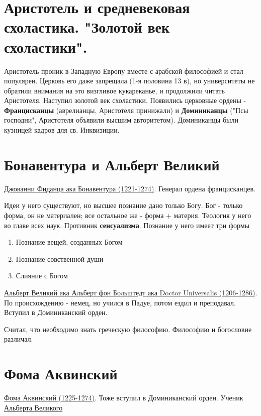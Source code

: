 \section{Аристотель и средневековая схоластика. "Золотой век схоластики".}
Аристотель проник в Западную Европу вместе с арабской философией и стал популярен. Церковь его даже запрещала (1-я половина 13 в), но университеты не обратили внимания на это визгливое кукареканье, и продолжили читать Аристотеля. Наступил золотой век схоластики. Появились церковные ордены - \textbf{Францисканцы} (аврелианцы, Аристотеля принижали) и \textbf{Доминиканцы} ("Псы господни", Аристотеля объявили высшим авторитетом). Доминиканцы были кузницей кадров для св. Инквизиции.

\section{Бонавентура и Альберт Великий}
\underline{Джованни Фиданца ака Бонавентура (1221-1274)}. Генерал ордена францисканцев. 

Идеи у него существуют, но высшее познание дано только Богу. Бог - только форма, он не материален; все остальное же - форма + материя. Теология у него во главе всех наук. Противник \textbf{сенсуализма}. Познание у него имеет три формы
\begin{enumerate}
\item Познание вещей, созданных Богом
\item Познание совственной души
\item Слияние с Богом
\end{enumerate}


\underline{Альберт Великий  ака Альберт фон Больштедт ака Doctor Universalis (1206-1286)}. По происхождению - немец, но учился в Падуе, потом ездил и преподавал. Вступил в Доминиканский орден.

Считал, что необходимо знать греческую философию. Философию и богословие различал. 

\section{Фома Аквинский}
\underline{Фома Аквинский (1225-1274)}. Тоже вступил в Доминиканский орден. Ученик \underline{Альберта Великого} 

